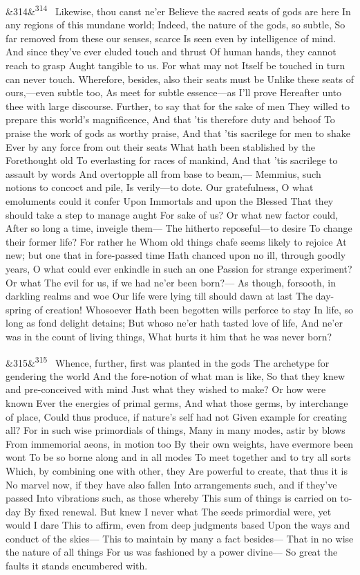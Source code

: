 \documentclass[12pt]{article}
\newcommand{\para}[1][]{\par\noindent\ifx&#1&\else\textsuperscript{\footnotesize #1}~\fi}
\begin{document}
\para[314] Likewise, thou canst ne'er Believe the sacred seats of gods are here In any regions of this mundane world; Indeed, the nature of the gods, so subtle, So far removed from these our senses, scarce Is seen even by intelligence of mind. And since they've ever eluded touch and thrust Of human hands, they cannot reach to grasp Aught tangible to us. For what may not Itself be touched in turn can never touch. Wherefore, besides, also their seats must be Unlike these seats of ours,---even subtle too, As meet for subtle essence---as I'll prove Hereafter unto thee with large discourse. Further, to say that for the sake of men They willed to prepare this world's magnificence, And that 'tis therefore duty and behoof To praise the work of gods as worthy praise, And that 'tis sacrilege for men to shake Ever by any force from out their seats What hath been stablished by the Forethought old To everlasting for races of mankind, And that 'tis sacrilege to assault by words And overtopple all from base to beam,--- Memmius, such notions to concoct and pile, Is verily---to dote. Our gratefulness, O what emoluments could it confer Upon Immortals and upon the Blessed That they should take a step to manage aught For sake of us? Or what new factor could, After so long a time, inveigle them--- The hitherto reposeful---to desire To change their former life? For rather he Whom old things chafe seems likely to rejoice At new; but one that in fore-passed time Hath chanced upon no ill, through goodly years, O what could ever enkindle in such an one Passion for strange experiment? Or what The evil for us, if we had ne'er been born?--- As though, forsooth, in darkling realms and woe Our life were lying till should dawn at last The day-spring of creation! Whosoever Hath been begotten wills perforce to stay In life, so long as fond delight detains; But whoso ne'er hath tasted love of life, And ne'er was in the count of living things, What hurts it him that he was never born?

\para[315] Whence, further, first was planted in the gods The archetype for gendering the world And the fore-notion of what man is like, So that they knew and pre-conceived with mind Just what they wished to make? Or how were known Ever the energies of primal germs, And what those germs, by interchange of place, Could thus produce, if nature's self had not Given example for creating all? For in such wise primordials of things, Many in many modes, astir by blows From immemorial aeons, in motion too By their own weights, have evermore been wont To be so borne along and in all modes To meet together and to try all sorts Which, by combining one with other, they Are powerful to create, that thus it is No marvel now, if they have also fallen Into arrangements such, and if they've passed Into vibrations such, as those whereby This sum of things is carried on to-day By fixed renewal. But knew I never what The seeds primordial were, yet would I dare This to affirm, even from deep judgments based Upon the ways and conduct of the skies--- This to maintain by many a fact besides--- That in no wise the nature of all things For us was fashioned by a power divine--- So great the faults it stands encumbered with.
\end{document}

